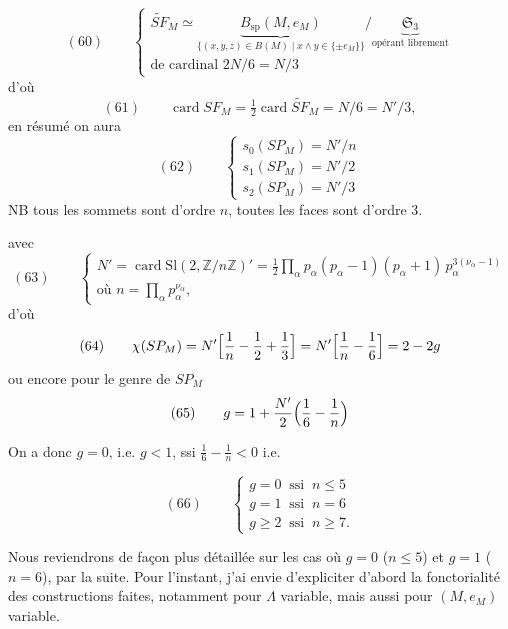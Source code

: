 \documentclass[11pt,a4paper]{article}
\begin{document}
\[
(60)\qquad
\begin{cases}
\widetilde{SF}_M \simeq \underbrace{B_{\mathrm{sp}}(M, e_M)}_{\{(x,y,z) \in B(M) \mid x \wedge y \in \{\pm e_M\}\}} / \underbrace{\mathfrak{S}_3}_{\text{opérant librement}} \\
\text{de cardinal } 2N/6 = N/3
\end{cases}
\]
d'où
\[
(61)\qquad \operatorname{card} SF_M = \tfrac{1}{2} \operatorname{card} \widetilde{SF}_M = N/6 = N'/3 ,
\]
en résumé on aura
\[
(62)\qquad
\begin{cases}
s_0(SP_M) = N'/n \\
s_1(SP_M) = N'/2 \\
s_2(SP_M) = N'/3
\end{cases}
\]
NB tous les sommets sont d'ordre $n$, toutes les faces sont d'ordre $3$.


avec
\[
(63)\qquad
\begin{cases}
N' = \operatorname{card} \mathrm{Sl}(2, \mathbb{Z}/n\mathbb{Z})' = \frac{1}{2} \prod_\alpha p_\alpha (p_\alpha - 1)(p_\alpha + 1)\, p_\alpha^{3(\nu_\alpha - 1)} \\
\text{où } n = \prod_\alpha p_\alpha^{\nu_\alpha},
\end{cases}
\]
d'où
\[
(64)\qquad \chi(SP_M) = N'\Bigl[\frac{1}{n} - \frac{1}{2} + \frac{1}{3}\Bigr] = N'\Bigl[\frac{1}{n} - \frac{1}{6}\Bigr] = 2 - 2g
\]
ou encore pour le genre de $SP_M$
\[
(65)\qquad g = 1 + \frac{N'}{2}\Bigl(\frac{1}{6} - \frac{1}{n}\Bigr)
\]

On a donc $g = 0$, i.e. $g < 1$, ssi $\frac{1}{6} - \frac{1}{n} < 0$ i.e. 


\[
(66)\qquad
\begin{cases}
g = 0 \ \text{ ssi } \ n \leq 5 \\
g = 1 \ \text{ ssi } \ n = 6 \\
g \geq 2 \ \text{ ssi } \ n \geq 7 .
\end{cases}
\]

Nous reviendrons de façon plus détaillée sur les cas où $g = 0$ ($n \leq 5$) et $g = 1$ ($n = 6$), par la suite. Pour l'instant, j'ai envie d'expliciter d'abord la fonctorialité des constructions faites, notamment pour $\Lambda$ variable, mais aussi pour $(M, e_M)$ variable.
\end{document}
